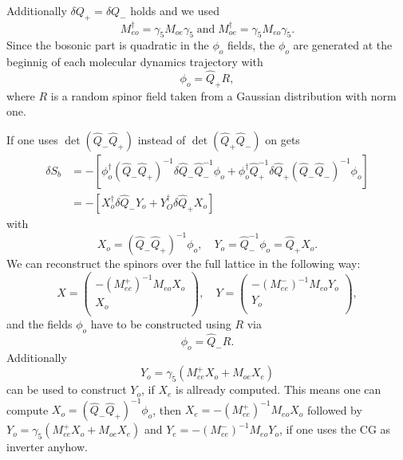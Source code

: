 Additionally $\delta Q_+ = \delta Q_-$ holds and we used
\[
M_{eo}^\dagger = \gamma_5 M_{oe}\gamma_5\;\textrm{and}\; M_{oe}^\dagger = \gamma_5 M_{eo}\gamma_5.
\]
Since the bosonic part is quadratic in the $\phi_o$ fields, the $\phi_o$ are
generated at the beginnig of each molecular dynamics trajectory with
\begin{equation}
  \label{eq:eo10}
  \phi_o = \hat Q_+ R,
\end{equation}
where $R$ is a random spinor field taken from a Gaussian distribution
with norm one.

If one uses $\det(\hat Q_{-}\hat Q_{+})$ instead of $\det(\hat
Q_{+}\hat Q_{-})$ on gets
\begin{equation}
  \label{eq:eo11}
  \begin{split}
    \delta S_b & = -[\phi_o^\dagger(\hat Q_{-} \hat Q_{+})^{-1}\delta\hat Q_{-}\hat
    Q_{-}^{-1} \phi_o + \phi_o^\dagger \hat Q_{+}^{-1}\delta\hat Q_{+}(\hat
    Q_{-}\hat Q_{-})^{-1}\phi_o]\\
    & = -[X_o^\dagger\delta\hat Q_{-}Y_o + Y_O^\dagger\delta\hat Q_{+}X_o]
  \end{split}
\end{equation}
with
\begin{equation}
  \label{eq:eo12}
  X_o = (\hat Q_{-} \hat Q_{+})^{-1}\phi_o, \quad Y_o = \hat Q_{-}^{-1}\phi_o=\hat
  Q_{+} X_o.
\end{equation}
 We can reconstruct the spinors over the full lattice in the following
way:
\begin{equation}
  \label{eq:eo13}
  X = 
  \begin{pmatrix}
    -(M_{ee}^+)^{-1}M_{eo}X_o \\ X_o\\
  \end{pmatrix},\quad
  Y = 
  \begin{pmatrix}
    -(M_{ee}^-)^{-1}M_{eo}Y_o \\ Y_o\\
  \end{pmatrix},
\end{equation}
and the fields $\phi_o$ have to be constructed using $R$ via
\begin{equation}
  \label{eq:14}
  \phi_o = \hat Q_{-} R.
\end{equation}
Additionally 
\[
Y_o = \gamma_5(M_{ee}^{+}X_o + M_{oe} X_e)
\]
can be used to construct $Y_o$, if $X_e$ is allready computed. This
means one can compute $X_o = (\hat Q_{-} \hat Q_{+})^{-1}\phi_o$, then
$X_e = -(M_{ee}^+)^{-1}M_{eo}X_o$ followed by $Y_o = \gamma_5(M_{ee}^{+}X_o
+ M_{oe} X_e)$ and $Y_e = -(M_{ee}^-)^{-1}M_{eo}Y_o$, if one uses the
CG as inverter anyhow.

